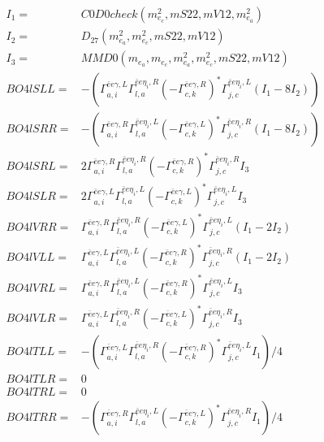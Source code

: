 \documentclass[A4,landscape]{article}
\begin{document}
\begin{align} 
I_1 = & C0D0check(m^2_{e_{{c}}}, mS22, mV12, m^2_{e_{{a}}}) \\ 
I_2 = & D_{27}(m^2_{e_{{a}}}, m^2_{e_{{c}}}, mS22, mV12) \\ 
I_3 = & MMD0(m_{e_{{a}}}, m_{e_{{c}}}, m^2_{e_{{a}}}, m^2_{e_{{c}}}, mS22, mV12) \\ 
  BO4lSLL= & -( \Gamma^{\bar{e}e \gamma ,L}_{a, i} \Gamma^{\bar{e}e \eta_i ,R}_{l, a} (- \Gamma^{\bar{e}e \gamma ,R} _{c, k})^* \Gamma^{\bar{e}e \eta_i ,L}_{j, c} (I_1 - 8 I_2)) \\ 
  BO4lSRR= & -( \Gamma^{\bar{e}e \gamma ,R}_{a, i} \Gamma^{\bar{e}e \eta_i ,L}_{l, a} (- \Gamma^{\bar{e}e \gamma ,L} _{c, k})^* \Gamma^{\bar{e}e \eta_i ,R}_{j, c} (I_1 - 8 I_2)) \\ 
  BO4lSRL= & 2  \Gamma^{\bar{e}e \gamma ,R}_{a, i} \Gamma^{\bar{e}e \eta_i ,R}_{l, a} (- \Gamma^{\bar{e}e \gamma ,R} _{c, k})^* \Gamma^{\bar{e}e \eta_i ,R}_{j, c} I_3 \\ 
  BO4lSLR= & 2  \Gamma^{\bar{e}e \gamma ,L}_{a, i} \Gamma^{\bar{e}e \eta_i ,L}_{l, a} (- \Gamma^{\bar{e}e \gamma ,L} _{c, k})^* \Gamma^{\bar{e}e \eta_i ,L}_{j, c} I_3 \\ 
  BO4lVRR= &  \Gamma^{\bar{e}e \gamma ,R}_{a, i} \Gamma^{\bar{e}e \eta_i ,R}_{l, a} (- \Gamma^{\bar{e}e \gamma ,L} _{c, k})^* \Gamma^{\bar{e}e \eta_i ,L}_{j, c} (I_1 - 2 I_2) \\ 
  BO4lVLL= &  \Gamma^{\bar{e}e \gamma ,L}_{a, i} \Gamma^{\bar{e}e \eta_i ,L}_{l, a} (- \Gamma^{\bar{e}e \gamma ,R} _{c, k})^* \Gamma^{\bar{e}e \eta_i ,R}_{j, c} (I_1 - 2 I_2) \\ 
  BO4lVRL= &  \Gamma^{\bar{e}e \gamma ,R}_{a, i} \Gamma^{\bar{e}e \eta_i ,L}_{l, a} (- \Gamma^{\bar{e}e \gamma ,R} _{c, k})^* \Gamma^{\bar{e}e \eta_i ,L}_{j, c} I_3 \\ 
  BO4lVLR= &  \Gamma^{\bar{e}e \gamma ,L}_{a, i} \Gamma^{\bar{e}e \eta_i ,R}_{l, a} (- \Gamma^{\bar{e}e \gamma ,L} _{c, k})^* \Gamma^{\bar{e}e \eta_i ,R}_{j, c} I_3 \\ 
  BO4lTLL= & -( \Gamma^{\bar{e}e \gamma ,L}_{a, i} \Gamma^{\bar{e}e \eta_i ,R}_{l, a} (- \Gamma^{\bar{e}e \gamma ,R} _{c, k})^* \Gamma^{\bar{e}e \eta_i ,L}_{j, c} I_1)/4 \\ 
  BO4lTLR= & 0 \\ 
  BO4lTRL= & 0 \\ 
  BO4lTRR= & -( \Gamma^{\bar{e}e \gamma ,R}_{a, i} \Gamma^{\bar{e}e \eta_i ,L}_{l, a} (- \Gamma^{\bar{e}e \gamma ,L} _{c, k})^* \Gamma^{\bar{e}e \eta_i ,R}_{j, c} I_1)/4 \\ 
\end{align} 
\end{document}
